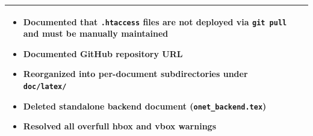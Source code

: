 \documentclass[12pt]{article}
\begin{document}
\begin{longtable}{p{2cm}p{2.5cm}p{8cm}}
\begin{itemize}[nosep,leftmargin=*]
    \item Documented that \texttt{.htaccess} files are not deployed via \texttt{git pull} and must be manually maintained
    \item Documented GitHub repository URL
    \item Reorganized into per-document subdirectories under \texttt{doc/latex/}
    \item Deleted standalone backend document (\texttt{onet\_backend.tex})
    \item Resolved all overfull hbox and vbox warnings
\end{itemize} \\
\bottomrule
\end{longtable}
\end{document}
